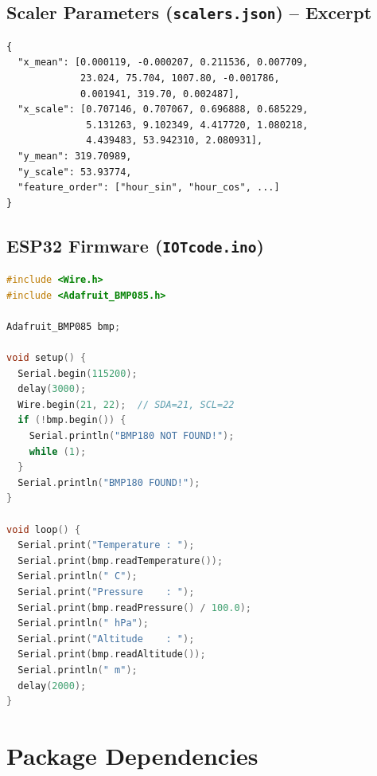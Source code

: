 \section{Scaler Parameters (\texttt{scalers.\allowbreak{}json}) -- Excerpt}

\begin{lstlisting}[language={},caption={Model/scalers.json (abbreviated)}]
{
  "x_mean": [0.000119, -0.000207, 0.211536, 0.007709,
             23.024, 75.704, 1007.80, -0.001786,
             0.001941, 319.70, 0.002487],
  "x_scale": [0.707146, 0.707067, 0.696888, 0.685229,
              5.131263, 9.102349, 4.417720, 1.080218,
              4.439483, 53.942310, 2.080931],
  "y_mean": 319.70989,
  "y_scale": 53.93774,
  "feature_order": ["hour_sin", "hour_cos", ...]
}
\end{lstlisting}

\section{ESP32 Firmware (\texttt{IOTcode.\allowbreak{}ino})}

\begin{lstlisting}[language=C,caption={IOTcode/IOTcode.ino -- BMP180 sensor sketch}]
#include <Wire.h>
#include <Adafruit_BMP085.h>

Adafruit_BMP085 bmp;

void setup() {
  Serial.begin(115200);
  delay(3000);
  Wire.begin(21, 22);  // SDA=21, SCL=22
  if (!bmp.begin()) {
    Serial.println("BMP180 NOT FOUND!");
    while (1);
  }
  Serial.println("BMP180 FOUND!");
}

void loop() {
  Serial.print("Temperature : ");
  Serial.print(bmp.readTemperature());
  Serial.println(" C");
  Serial.print("Pressure    : ");
  Serial.print(bmp.readPressure() / 100.0);
  Serial.println(" hPa");
  Serial.print("Altitude    : ");
  Serial.print(bmp.readAltitude());
  Serial.println(" m");
  delay(2000);
}
\end{lstlisting}

\chapter{Package Dependencies}
\label{app:dependencies}

